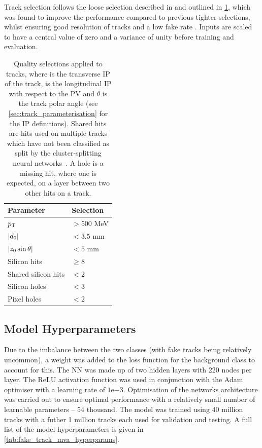 Track selection follows the loose selection described in  and outlined in \cref{tab:fake_track_mva_selections}, which was found to improve the performance compared to previous tighter selections, whilst ensuring good resolution of tracks and a low fake rate \cite{PERF-2015-08}.
Inputs are scaled to have a central value of zero and a variance of unity before training and evaluation.

\begin{table}[!htbp]
  \footnotesize\centering
  \setlength{\tabcolsep}{0.5em} %
  \begin{tabular}{ll}
    \toprule\hline
    \textbf{Parameter} & \textbf{Selection} \\
    \hline
    $p_{\text{T}}$                & $> 500$ MeV \\
    $|d_{0}|$              & $< 3.5$ mm \\
    $|z_{0}\sin\theta|$   & $< 5$ mm \\
    Silicon hits         & $\ge 8$ \\
    Shared silicon hits  & $< 2$ \\
    Silicon holes        & $< 3$ \\
    Pixel holes          & $< 2$ \\
    \hline\bottomrule
  \end{tabular}
  \caption{
    Quality selections applied to tracks,
    where \dzero is the transverse IP of the track, \zzero is the longitudinal IP with respect to the PV and $\theta$ is the track polar angle (see \cref{sec:track_parameterisation} for the IP definitions).
    Shared hits are hits used on multiple tracks which have not been classified as split by the cluster-splitting neural networks~\cite{PERF-2015-08}.
    A hole is a missing hit, where one is expected, on a layer between two other hits on a track.
    }
  \vspace{4mm}
  \label{tab:fake_track_mva_selections}
\end{table}



\subsection{Model Hyperparameters}\label{sec:hyperparameters}

Due to the imbalance between the two classes (with fake tracks being relatively uncommon), a weight was added to the loss function for the background class to account for this.
The NN was made up of two hidden layers with 220 nodes per layer.
The ReLU activation function was used in conjunction with the Adam optimiser with a learning rate of $1\text{e}{-3}$.
Optimisation of the networks architecture was carried out to ensure optimal performance with a relatively small number of learnable parameters -- 54 thousand.
The model was trained using \num{40} million tracks with a futher \num{1} million tracks each used for validation and testing.
A full list of the model hyperparameters is given in \cref{tab:fake_track_mva_hyperparams}.

